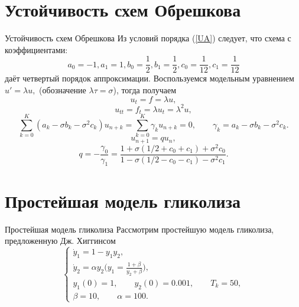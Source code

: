 \documentclass[ignorenonframetext,unicode,handout, 9pt]{beamer}
\begin{document}
\section{Устойчивость схем Обрешкова}

\begin{frame}[t]{Устойчивость схем Обрешкова}
Из условий порядка (\ref{UA}) следует, что схема с коэффициентами:
$$ a_0 = -1, a_1 = 1, b_0 = \frac{1}{2}, b_1 = \frac{1}{2}, c_0 = \frac{1}{12}, c_1 = \frac{1}{12}$$
даёт четвертый порядок аппроксимации. Воспользуемся модельным уравнением $u' = \lambda u,$ (обозначение $\lambda \tau = \sigma$), тогда получаем \\
$$u_t = f = \lambda u,$$
$$u_{tt} = f_t = \lambda u_t =  \lambda^2 u,$$
$$\sum\limits_{k=0}^{K}(a_k - \sigma b_k - \sigma^2 c_k)u_{n+k} =  \sum\limits_{k=0}^{K}\gamma_{k} u_{n+k} = 0, \qquad   \gamma_k = a_k - \sigma b_k - \sigma^2 c_k.$$
$$u_{n+1} = q u_{n},$$
$$q = -\frac{\gamma_0}{\gamma_1} = \frac{1 + \sigma(1/2 + c_0 + c_1) + \sigma^2 c_0}{1 - \sigma(1/2 - c_0 - c_1) - \sigma^2 c_1}.$$

\end{frame}

\begin{frame}[t]
\begin{figure}[htbp]
\label{fig:image}
\end{figure}
\end{frame}


\section[Простейшая модель гликолиза]{Простейшая модель гликолиза}

\begin{frame}[t]{Простейшая модель гликолиза}
Рассмотрим простейшую модель гликолиза, предложенную Дж. Хиггинсом
\begin{equation}
\label{GL}
 \begin{cases}
   \dot{y}_1 = 1 - y_1 y_2, \\
   \dot{y}_2 = \alpha y_2 \bigg( y_1 = \frac{1 + \beta}{y_2 + \beta} \bigg), \\
   y_1(0) = 1, \qquad y_2(0) = 0.001, \qquad T_k = 50, \\
   \beta = 10, \qquad \alpha = 100.
 \end{cases}
\end{equation}
\end{frame}
\end{document}
